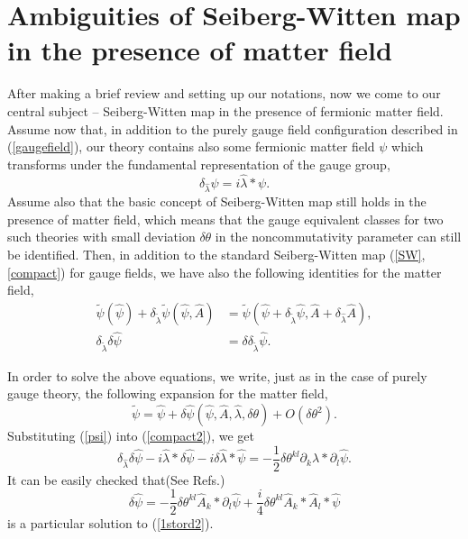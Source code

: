 \documentclass[a4paper,a4paper]{article}%
\begin{document}
\section{Ambiguities of Seiberg-Witten map in the presence of matter field}

After making a brief review and setting up our notations, now we come to our
central subject -- Seiberg-Witten map in the presence of fermionic matter
field. Assume now that, in addition to the purely gauge field configuration
described in (\ref{gaugefield}), our theory contains also some fermionic
matter field $\psi$ which transforms under the fundamental representation of
the gauge group,%
\begin{equation}
\delta_{\hat{\lambda}}\psi=i\hat{\lambda}\ast\psi. \label{matter}%
\end{equation}
Assume also that the basic concept of Seiberg-Witten map still holds in the
presence of matter field, which means that the gauge equivalent classes for
two such theories with small deviation $\delta\theta$ in the noncommutativity
parameter can still be identified. Then, in addition to the standard
Seiberg-Witten map (\ref{SW},\ref{compact}) for gauge fields, we have also the
following identities for the matter field,%
\begin{align}
\tilde{\psi}(\hat{\psi})+\delta_{\tilde{\lambda}}\tilde{\psi}(\hat{\psi
},\hat{A})  &  =\tilde{\psi}(\hat{\psi}+\delta_{\tilde{\lambda}}\hat{\psi
},\hat{A}+\delta_{\hat{\lambda}}\hat{A}),\label{SW2}\\
\delta_{\tilde{\lambda}}\delta\hat{\psi}  &  =\delta\delta_{\tilde{\lambda}%
}\hat{\psi}. \label{compact2}%
\end{align}

In order to solve the above equations, we write, just as in the case of purely
gauge theory, the following expansion for the matter field,%
\begin{equation}
\tilde{\psi}=\hat{\psi}+\delta\hat{\psi}(\hat{\psi},\hat{A},\hat{\lambda
},\delta\theta)+O(\delta\theta^{2}).\label{psi}%
\end{equation}
Substituting (\ref{psi}) into (\ref{compact2}), we get%
\begin{equation}
\delta_{\hat{\lambda}}\delta\hat{\psi}-i\hat{\lambda}\ast\delta\hat{\psi
}-i\delta\hat{\lambda}\ast\hat{\psi}=-\frac{1}{2}\delta\theta^{kl}\partial
_{k}\hat{\lambda}\ast\partial_{l}\hat{\psi}.\label{1stord2}%
\end{equation}
It can be easily checked that(See Refs.\cite{3})
\begin{equation}
\delta\hat{\psi}=-\frac{1}{2}\delta\theta^{kl}\hat{A}_{k}\ast\partial_{l}%
\hat{\psi}+\frac{i}{4}\delta\theta^{kl}\hat{A}_{k}\ast\hat{A}_{l}\ast\hat
{\psi}\label{psi2}%
\end{equation}
is a particular solution to (\ref{1stord2}).
\end{document}
